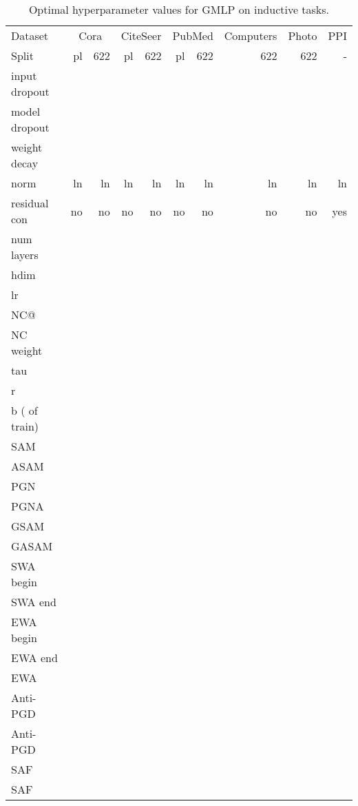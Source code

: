\documentclass[runningheads]{llncs}
\begin{document}
\begin{table*}[!ht]
    \centering   
    \caption{Optimal hyperparameter values for GMLP on inductive tasks.}
    \label{tab:gmlp_params_ind}
    \tiny
    \begin{tabular}{l|r r | r r | r r | r | r | r }\toprule
    Dataset       & \multicolumn{2}{c|}{Cora} & \multicolumn{2}{c|}{CiteSeer} & \multicolumn{2}{c|}{PubMed} & Computers & Photo & PPI\\
    Split         & pl & 622 & pl & 622 & pl & 622 & 622 & 622 & -\\ \midrule
    input dropout &  &  &  &  &  &  &  &  &  \\
    model dropout &  &  &  &  &  &  &  &  &  \\
    weight decay  &  &  &  &  &  &  &  &  &  \\
    norm          & ln & ln & ln & ln & ln & ln & ln & ln & ln\\
    residual con           & no & no & no & no & no & no & no & no  & yes \\
    num layers    &  &  &  &  &  &  &  &  &   \\
    hdim          &  &  &  &  &  &  &  &  &  \\
    lr            &  &  &  &  &  &  &  &  &  \\ 
    NC@           &  &  &  &  &  &  &  &  &  \\
    NC weight     &  &  &  &  &  &  &  &  &  \\
    tau           &  &  &  &  &  &  &  &  &  \\
    r             &  &  &  &  &  &  &  &  &  \\
     b ( of train)&  &  &  &  &  &  &  &  &  \\\midrule
    SAM      &  &  &  &  &  &  &  &  &  \\
    ASAM     &  &  &  &  &  &  &  &  &  \\
    PGN    &  &  &  &  &  &  &  &  &  \\
    PGNA   &  &  &  &  &  &  &  &  &  \\
    GSAM   &  &  &  &  &  &  &  &  &  \\
    GASAM  &  &  &  &  &  &  &  &  &  \\
    SWA begin     &  &  &  &  &  &  &  &  &  \\
    SWA end       &  &  &  &  &  &  &  &  &  \\
    EWA begin     &  &  &  &  &  &  &  &  &  \\
    EWA end       &  &  &  &  &  &  &  &  &  \\
    EWA   &  &  &  &  &  &  &  &  &  \\
    Anti-PGD  &  &  &  &  &  &  &  &  &  \\
    Anti-PGD  &  &  &  &  &  &  &  &  &  \\
    SAF    &  &  &  &  &  &  &  &  &  \\
    SAF       &  &  &  &  &  &  &  &  &   \\
    \bottomrule
    \end{tabular}
\end{table*}
\end{document}
